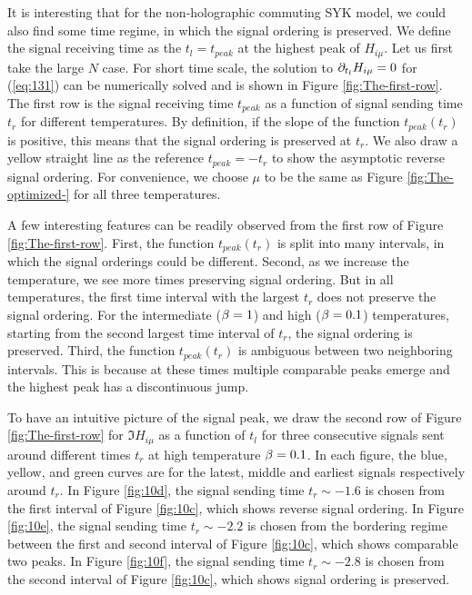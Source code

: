\documentclass[11pt]{article}
\renewcommand{\>}{\rangle}
\newcommand{\<}{\langle}
\begin{document}
It is interesting that for the non-holographic commuting SYK model,
we could also find some time regime, in which the signal ordering
is preserved. We define the signal receiving time as the $t_{l}=t_{peak}$
at the highest peak of $H_{i\mu}$. Let us first take the large $N$
case. For short time scale, the solution to $\partial_{t_{l}}H_{i\mu}=0$
for (\ref{eq:131}) can be numerically solved and is shown in Figure
\ref{fig:The-first-row}. The first row is the signal receiving time
$t_{peak}$ as a function of signal sending time $t_{r}$ for different
temperatures. By definition, if the slope of the function $t_{peak}(t_{r})$
is positive, this means that the signal ordering is preserved at $t_{r}$.
We also draw a yellow straight line as the reference $t_{peak}=-t_{r}$
to show the asymptotic reverse signal ordering. For convenience, we
choose $\mu$ to be the same as Figure \ref{fig:The-optimized-} for
all three temperatures. 

A few interesting features can be readily observed from the first
row of Figure \ref{fig:The-first-row}. First, the function $t_{peak}(t_{r})$
is split into many intervals, in which the signal orderings could
be different. Second, as we increase the temperature, we see more
times preserving signal ordering. But in all temperatures, the first
time interval with the largest $t_{r}$ does not preserve the signal ordering.
For the intermediate ($\beta=1$) and high ($\beta=0.1$) temperatures, starting
from the second largest time interval of $t_{r}$, the signal ordering
is preserved. Third, the function $t_{peak}(t_{r})$ is ambiguous
between two neighboring intervals. This is because at these times
multiple comparable peaks emerge and the highest peak has a discontinuous
jump. 

To have an intuitive picture of the signal peak, we draw the second
row of Figure \ref{fig:The-first-row} for $\Im H_{i\mu}$ as a function
of $t_{l}$ for three consecutive signals sent around different times
$t_{r}$ at high temperature $\beta=0.1$. In each figure, the blue,
yellow, and green curves are for the latest, middle and earliest signals
respectively around $t_{r}$. In Figure \ref{fig:10d}, the signal
sending time $t_{r}\sim-1.6$ is chosen from the first interval of
Figure \ref{fig:10c}, which shows reverse signal ordering. In Figure
\ref{fig:10e}, the signal sending time $t_{r}\sim-2.2$ is chosen
from the bordering regime between the first and second interval of Figure
\ref{fig:10c}, which shows comparable two peaks. In Figure \ref{fig:10f},
the signal sending time $t_{r}\sim-2.8$ is chosen from the second
interval of Figure \ref{fig:10c}, which shows signal ordering is
preserved. 
\end{document}
